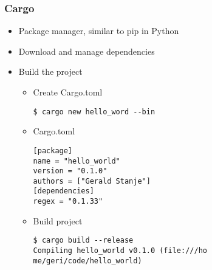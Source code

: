 \documentclass{beamer} %
\begin{document}
\begin{frame}[fragile]
\frametitle{Cargo}


\begin{itemize}
    \item Package manager, similar to pip in Python
    \item Download and manage dependencies
    \item Build the project
    \begin{itemize}
        \item Create Cargo.toml
        \begin{lstlisting}
$ cargo new hello_word --bin
        \end{lstlisting}
        \item Cargo.toml
        \begin{lstlisting}
[package]
name = "hello_world"
version = "0.1.0"
authors = ["Gerald Stanje"]
[dependencies]
regex = "0.1.33"
        \end{lstlisting}
        \item Build project
        \begin{lstlisting}
$ cargo build --release
Compiling hello_world v0.1.0 (file:///ho
me/geri/code/hello_world)
        \end{lstlisting}
    \end{itemize}
\end{itemize}

\end{frame}
\end{document}

